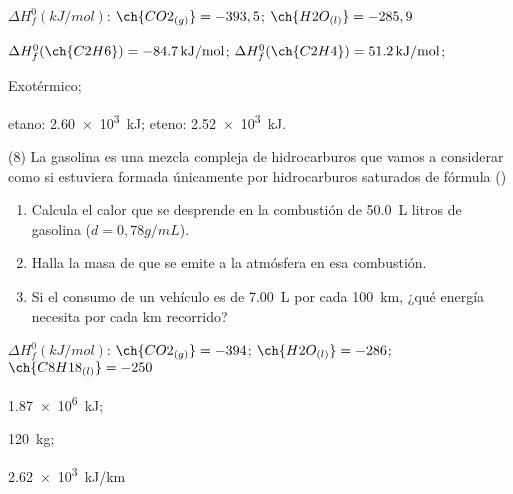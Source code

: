 \documentclass[10pt]{article}
\newenvironment{gexdatos}{
      \noindent\makebox[0pt][r]{\textit{Datos:}}
    }{\vspace{5pt}}
\begin{document}
\begin{multicols}{2}
\begin{exercise}[
    tags    = {},
    topics  = {química, termodinámica, termoquímica},
    source  = {FQ 1B MGH 2016, p179, e7},
  ]
  \begin{gexdatos}
    \( \Delta H^0_f (\si{kJ/mol}) \): \( \ch{CO2_{(g)}} = -393,5 \); \( \ch{H2O_{(l)}} = -285,9 \)
  \end{gexdatos}
\end{exercise}

\begin{solution}
  \begin{enumerate*}
    \item \( \Delta H^0_f (\ch{C2H6})= \SI{-84,7}{kJ/mol} \); \( \Delta H^0_f (\ch{C2H4}) = \SI{51.2}{kJ/mol} \); \item Exotérmico; \item etano: \SI{2.60e3}{kJ}; eteno: \SI{2.52e3}{kJ}.
  \end{enumerate*}
\end{solution}




\begin{exercise}[
    tags    = {},
    topics  = {química, termodinámica, termoquímica},
    source  = {FQ 1B MGH 2016, p179, e8},
  ]
  (8) La gasolina es una mezcla compleja de hidrocarburos que
  vamos a considerar como si estuviera formada únicamente
  por hidrocarburos saturados de fórmula ()
  \begin{enumerate}
    \item Calcula el calor que se desprende en la combustión de
    \SI{50.0}{\liter} litros de gasolina (\( d = 0,78 g/mL \)).
    \item Halla la masa de  que se emite a la atmósfera en esa
    combustión.
    \item Si el consumo de un vehículo es de \SI{7.00}{\liter} por cada
    \SI{100}{km}, ¿qué energía necesita por cada \si{km} recorrido?
  \end{enumerate}

  \begin{gexdatos}
    \( \Delta H^0_f (\si{kJ/mol}) \): \( \ch{CO2_{(g)}} = -394 \); \( \ch{H2O_{(l)}} = -286 \); \( \ch{C8H18_{(l)}} = -250 \)
  \end{gexdatos}
\end{exercise}

\begin{solution}
  \begin{enumerate*}
    \item \SI{1.87e6}{kJ}; \item \SI{120}{\kilo\gram}; \item \SI{2.62e3}{kJ/km}
  \end{enumerate*}
\end{solution}





\end{multicols}
\end{document}
